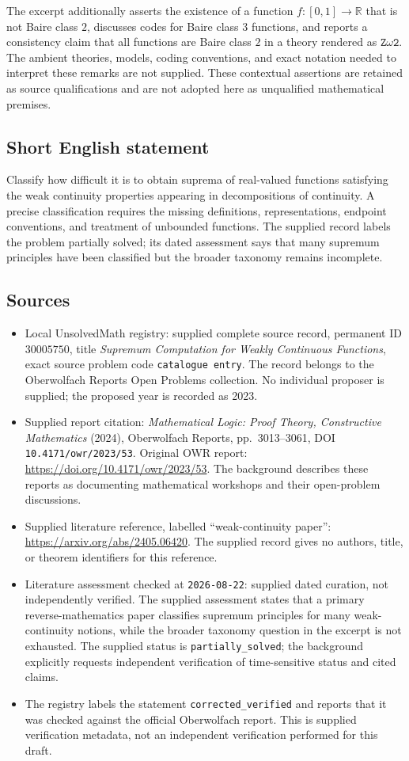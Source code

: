 \documentclass[11pt]{article}
\newcommand{\R}{\mathbb{R}}
\begin{document}
The excerpt additionally asserts the existence of a function \(f:[0,1]\to\R\) that is not Baire class \(2\), discusses codes for Baire class \(3\) functions, and reports a consistency claim that all functions are Baire class \(2\) in a theory rendered as \(\texttt{Z}\omega\texttt{2}\). The ambient theories, models, coding conventions, and exact notation needed to interpret these remarks are not supplied. These contextual assertions are retained as source qualifications and are not adopted here as unqualified mathematical premises.
\subsection{Short English statement}
Classify how difficult it is to obtain suprema of real-valued functions satisfying the weak continuity properties appearing in decompositions of continuity. A precise classification requires the missing definitions, representations, endpoint conventions, and treatment of unbounded functions. The supplied record labels the problem partially solved; its dated assessment says that many supremum principles have been classified but the broader taxonomy remains incomplete.
\subsection{Sources}
\begin{itemize}
\item Local UnsolvedMath registry: supplied complete source record, permanent ID \(30005750\), title \emph{Supremum Computation for Weakly Continuous Functions}, exact source problem code \texttt{catalogue entry}. The record belongs to the Oberwolfach Reports Open Problems collection. No individual proposer is supplied; the proposed year is recorded as 2023.
\item Supplied report citation: \emph{Mathematical Logic: Proof Theory, Constructive Mathematics} (2024), Oberwolfach Reports, pp.\ 3013--3061, DOI \texttt{10.4171/owr/2023/53}. Original OWR report: \url{https://doi.org/10.4171/owr/2023/53}. The background describes these reports as documenting mathematical workshops and their open-problem discussions.
\item Supplied literature reference, labelled ``weak-continuity paper'': \url{https://arxiv.org/abs/2405.06420}. The supplied record gives no authors, title, or theorem identifiers for this reference.
\item Literature assessment checked at \texttt{2026-08-22}: supplied dated curation, not independently verified. The supplied assessment states that a primary reverse-mathematics paper classifies supremum principles for many weak-continuity notions, while the broader taxonomy question in the excerpt is not exhausted. The supplied status is \texttt{partially\_solved}; the background explicitly requests independent verification of time-sensitive status and cited claims.
\item The registry labels the statement \texttt{corrected\_verified} and reports that it was checked against the official Oberwolfach report. This is supplied verification metadata, not an independent verification performed for this draft.
\end{itemize}
\end{document}
